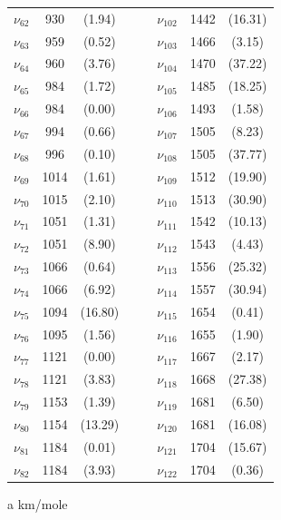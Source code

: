 \begin{table}[H]
\begin{center}
\begin{threeparttable}
\begin{tabular}{c c c c c c c c}
	$\nu_{62}$&	930	&(1.94)& & &	$\nu_{102}$&	1442&	(16.31)\\
	$\nu_{63}$&	959	&(0.52)	& & &$\nu_{103}$&	1466&	(3.15)\\
	$\nu_{64}$&	960	&(3.76)& & &	$\nu_{104}$&	1470&	(37.22)\\
	$\nu_{65}$&	984	&(1.72)& & &	$\nu_{105}$&	1485&	(18.25)\\
	$\nu_{66}$&	984	&(0.00)& & &	$\nu_{106}$&	1493&	(1.58)\\
	$\nu_{67}$&	994	&(0.66)& & &	$\nu_{107}$&	1505&	(8.23)\\
	$\nu_{68}$&	996	&(0.10)& & &	$\nu_{108}$&	1505&	(37.77)\\
	$\nu_{69}$&	1014&	(1.61)& & &	$\nu_{109}$&	1512&	(19.90)\\
	$\nu_{70}$&	1015&	(2.10)& & &	$\nu_{110}$&	1513&	(30.90)\\
	$\nu_{71}$&	1051&	(1.31)& & &	$\nu_{111}$&	1542&	(10.13)\\
	$\nu_{72}$&	1051&	(8.90)& & &	$\nu_{112}$&	1543&	(4.43)\\
	$\nu_{73}$&	1066&	(0.64)& & &	$\nu_{113}$&	1556&	(25.32)\\
	$\nu_{74}$&	1066&	(6.92)& & &	$\nu_{114}$&	1557&	(30.94)\\
	$\nu_{75}$&	1094&	(16.80)& & &	$\nu_{115}$&	1654&	(0.41)\\
	$\nu_{76}$&	1095&	(1.56)& & &	$\nu_{116}$&	1655&	(1.90)\\
	$\nu_{77}$&	1121&	(0.00)& & &	$\nu_{117}$&	1667&	(2.17)\\
	$\nu_{78}$&	1121&	(3.83)& & &	$\nu_{118}$&	1668&	(27.38)\\
	$\nu_{79}$&	1153&	(1.39)& & &	$\nu_{119}$&	1681&	(6.50)\\
	$\nu_{80}$&	1154&	(13.29)& & &	$\nu_{120}$&	1681&	(16.08)\\
	$\nu_{81}$&	1184&	(0.01)& & &	$\nu_{121}$&	1704&	(15.67)\\
	$\nu_{82}$&	1184&	(3.93)& & &	$\nu_{122}$&	1704&	(0.36)\\
	\bottomrule
\end{tabular}

\begin{tablenotes}
	\item[a] km/mole
\end{tablenotes}
\end{threeparttable}
\end{center}
\label{freq-1-methylcarbazoleDi}
\end{table}		
	
